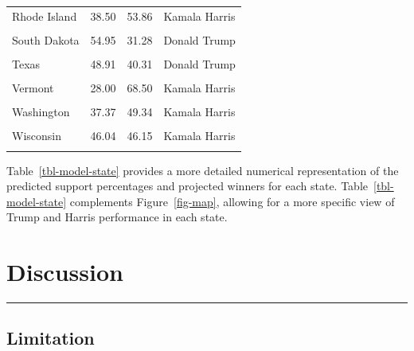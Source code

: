 \documentclass[
  letterpaper,
  DIV=11,
  numbers=noendperiod]{scrartcl}
\begin{document}
\begin{longtable}[t]{lrrl}
Rhode Island & 38.50 & 53.86 & Kamala Harris\\
\addlinespace
\cellcolor{gray!10}{South Carolina} & \cellcolor{gray!10}{50.72} & \cellcolor{gray!10}{37.46} & \cellcolor{gray!10}{Donald Trump}\\
South Dakota & 54.95 & 31.28 & Donald Trump\\
\cellcolor{gray!10}{Tennessee} & \cellcolor{gray!10}{47.66} & \cellcolor{gray!10}{24.50} & \cellcolor{gray!10}{Donald Trump}\\
Texas & 48.91 & 40.31 & Donald Trump\\
\cellcolor{gray!10}{Utah} & \cellcolor{gray!10}{51.29} & \cellcolor{gray!10}{33.23} & \cellcolor{gray!10}{Donald Trump}\\
\addlinespace
Vermont & 28.00 & 68.50 & Kamala Harris\\
\cellcolor{gray!10}{Virginia} & \cellcolor{gray!10}{41.59} & \cellcolor{gray!10}{44.89} & \cellcolor{gray!10}{Kamala Harris}\\
Washington & 37.37 & 49.34 & Kamala Harris\\
\cellcolor{gray!10}{West Virginia} & \cellcolor{gray!10}{57.15} & \cellcolor{gray!10}{25.25} & \cellcolor{gray!10}{Donald Trump}\\
Wisconsin & 46.04 & 46.15 & Kamala Harris\\
\addlinespace
\cellcolor{gray!10}{Wyoming} & \cellcolor{gray!10}{67.60} & \cellcolor{gray!10}{14.80} & \cellcolor{gray!10}{Donald Trump}\\
\bottomrule
\end{longtable}

Table~\ref{tbl-model-state} provides a more detailed numerical
representation of the predicted support percentages and projected
winners for each state. Table~\ref{tbl-model-state} complements
Figure~\ref{fig-map}, allowing for a more specific view of Trump and
Harris performance in each state.

\hypertarget{sec-discussion}{%
\section{Discussion}\label{sec-discussion}}

\begin{center}\rule{0.5\linewidth}{0.5pt}\end{center}

\hypertarget{limitation}{%
\subsection{Limitation}\label{limitation}}
\end{document}
